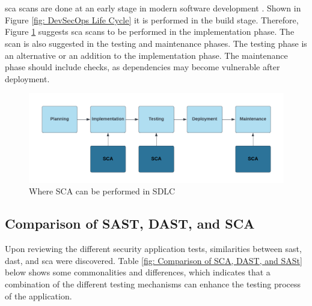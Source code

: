 \\~\\
\acrshort{sca} scans are done at an early stage in modern software development \cite{scaplasment}. Shown in Figure \ref{fig: DevSecOps Life Cycle} it is performed in the build stage. Therefore, Figure \ref{fig: Where SCA can be performed in SDLC} suggests \acrshort{sca} scans to be performed in the implementation phase. The scan is also suggested in the testing and maintenance phases. The testing phase is an alternative or an addition to the implementation phase. The maintenance phase should include checks, as dependencies may become vulnerable after deployment.

\vspace{2mm}
\begin{figure}[H]
    \centering
    \includegraphics[width=0.8\columnwidth]{Images/sca.png}
    \caption{Where SCA can be performed in SDLC} 
    \label{fig: Where SCA can be performed in SDLC}
\end{figure}

\newpage
\subsection{Comparison of SAST, DAST, and SCA}
Upon reviewing the different security application tests, similarities between \acrshort{sast}, \acrshort{dast}, and \acrshort{sca} were discovered. Table \ref{fig: Comparison of SCA, DAST, and SASt} below shows some commonalities and differences, which indicates that a combination of the different testing mechanisms can enhance the testing process of the application. 

